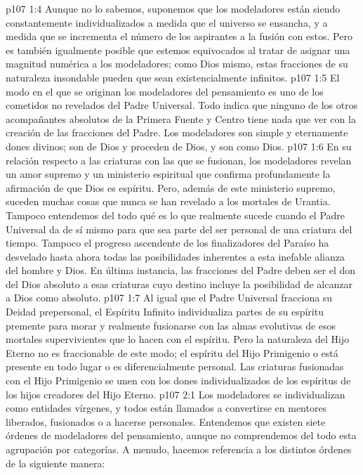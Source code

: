 \vs p107 1:4 Aunque no lo sabemos, suponemos que los modeladores están siendo constantemente individualizados a medida que el universo se ensancha, y a medida que se incrementa el número de los aspirantes a la fusión con estos. Pero es también igualmente posible que estemos equivocados al tratar de asignar una magnitud numérica a los modeladores; como Dios mismo, estas fracciones de su naturaleza insondable pueden que sean existencialmente infinitos.
\vs p107 1:5 El modo en el que se originan los modeladores del pensamiento es uno de los cometidos no revelados del Padre Universal. Todo indica que ninguno de los otros acompañantes absolutos de la Primera Fuente y Centro tiene nada que ver con la creación de las fracciones del Padre. Los modeladores son simple y eternamente dones divinos; son de Dios y proceden de Dios, y son como Dios.
\vs p107 1:6 En su relación respecto a las criaturas con las que se fusionan, los modeladores revelan un amor supremo y un ministerio espiritual que confirma profundamente la afirmación de que Dios es espíritu. Pero, además de este ministerio supremo, suceden muchas cosas que nunca se han revelado a los mortales de Urantia. Tampoco entendemos del todo qué es lo que realmente sucede cuando el Padre Universal da de sí mismo para que sea parte del ser personal de una criatura del tiempo. Tampoco el progreso ascendente de los finalizadores del Paraíso ha desvelado hasta ahora todas las posibilidades inherentes a esta inefable alianza del hombre y Dios. En última instancia, las fracciones del Padre deben ser el don del Dios absoluto a esas criaturas cuyo destino incluye la posibilidad de alcanzar a Dios como absoluto.
\vs p107 1:7 \pc Al igual que el Padre Universal fracciona su Deidad prepersonal, el Espíritu Infinito individualiza partes de su espíritu premente para morar y realmente fusionarse con las almas evolutivas de esos mortales supervivientes que lo hacen con el espíritu. Pero la naturaleza del Hijo Eterno no es fraccionable de este modo; el espíritu del Hijo Primigenio o está presente en todo lugar o es diferencialmente personal. Las criaturas fusionadas con el Hijo Primigenio se unen con los dones individualizados de los espíritus de los hijos creadores del Hijo Eterno.
\vs p107 2:1 Los modeladores se individualizan como entidades vírgenes, y todos están llamados a convertirse en mentores liberados, fusionados o a hacerse personales. Entendemos que existen siete órdenes de modeladores del pensamiento, aunque no comprendemos del todo esta agrupación por categorías. A menudo, hacemos referencia a los distintos órdenes de la siguiente manera:
